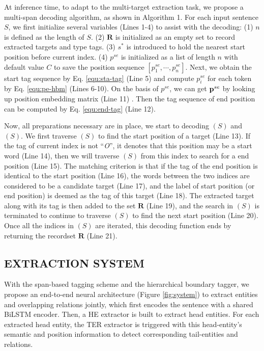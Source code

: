 \documentclass{ecai}
\begin{document}
At inference time, to adapt to the multi-target extraction task, we propose a multi-span decoding algorithm, as shown in Algorithm 1. 
For each input sentence $S$, we first initialize several variables (Lines 1-4) to assist with the decoding: (1) $n$ is defined as the length of $S$. (2) $\mathbf{R}$ is initialized as an empty set to record extracted targets and type tags. (3) $s^{*}$ is introduced to hold the nearest start position before current index. (4) $p^{se}$ is initialized as a list of length $n$ with default value $C$ to save the position sequence $[p^{se}_1,\cdots,p^{se}_n]$. 
Next, we obtain the start tag sequence by Eq. \ref{equ:sta-tag} (Line 5) and compute $p^{se}_i$ for each token by Eq. \ref{equ:pe-hbm} (Lines 6-10). 
On the basis of $p^{se}$, we can get $\boldsymbol{\rm{p}}^{se}$ by looking up position embedding matrix (Line 11) . 
Then the tag sequence of end position can be computed by Eq. \ref{equ:end-tag} (Line 12). 

Now, all preparations necessary are in place, we start to decoding $(S)$ and $(S)$. 
We first traverse $(S)$ to find the start position of a target (Line 13). 
If the tag of current index is not ``\emph{O}'', it denotes that this position may be a start word (Line 14), then we will traverse $(S)$ from this index to search for a end position (Line 15). 
The matching criterion is that if the tag of the end position is identical to the start position (Line 16), the words between the two indices are considered to be a candidate target (Line 17), and the label of start position (or end position) is deemed as the tag of this target (Line 18). 
The extracted target along with its tag is then added to the set $\mathbf{R}$ (Line 19), and the search in $(S)$ is terminated to continue to traverse $(S)$ to find the next start position (Line 20). 
Once all the indices in $(S)$ are iterated, this decoding function ends by returning the recordset $\mathbf{R}$ (Line 21).



\subsection{EXTRACTION SYSTEM}


With the span-based tagging scheme and the hierarchical boundary tagger, we propose an end-to-end neural architecture (Figure \ref{fig:system}) to extract entities and overlapping relations jointly, which first encodes the sentence with a shared BiLSTM encoder. 
Then, a HE extractor is built to extract head entities. 
For each extracted head entity, the TER extractor is triggered with this head-entity's semantic and position information to detect corresponding tail-entities and relations.
\end{document}
